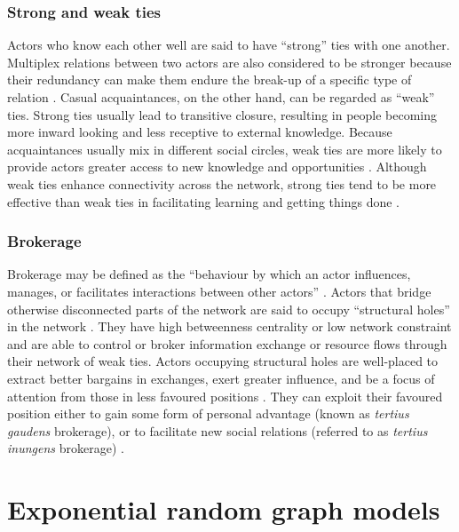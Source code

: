 \subsubsection{Strong and weak ties}

Actors who know each other well are said to have \enquote{strong} ties with one another. Multiplex relations between two actors are also considered to be stronger because their redundancy can make them endure the break-up of a specific type of relation \citep{dickison2016multilayer}. Casual acquaintances, on the other hand, can be regarded as \enquote{weak} ties. Strong ties usually lead to transitive closure, resulting in people becoming more inward looking and less receptive to external knowledge. Because acquaintances usually mix in different social circles, weak ties are more likely to provide actors greater access to new knowledge and opportunities \citep{granovetter1973strength}. Although weak ties enhance connectivity across the network, strong ties tend to be more effective than weak ties in facilitating learning and getting things done \citep{ahuja2000collaboration,burt2004structural,rost2011strength,phelps2012knowledge}. \medskip

\subsubsection{Brokerage}

Brokerage may be defined as the \enquote{behaviour by which an actor influences, manages, or facilitates interactions between other actors} \citep{obstfeld2014brokerage}. Actors that bridge otherwise disconnected parts of the network are said to occupy \enquote{structural holes} in the network \citep{burt1992structural}. They have high betweenness centrality or low network constraint and are able to control or broker information exchange or resource flows through their network of weak ties. Actors occupying structural holes are well-placed to extract better bargains in exchanges, exert greater influence, and be a focus of attention from those in less favoured positions \citep{burt1992structural,hanneman2005introduction,simpson2011network}. They can exploit their favoured position either to gain some form of personal advantage (known as \textit{tertius gaudens} brokerage), or to facilitate new social relations (referred to as \textit{tertius inungens} brokerage) \citep{obstfeld2005social,obstfeld2014brokerage,quintane2016brokers}. \medskip 

\section{Exponential random graph models}

